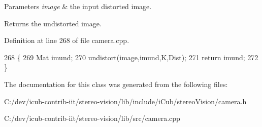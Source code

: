\begin{DoxyParams}{Parameters}
{\em image} & the input distorted image. \\
\hline
\end{DoxyParams}
\begin{DoxyReturn}{Returns}
the undistorted image. 
\end{DoxyReturn}


Definition at line 268 of file camera.\+cpp.


\begin{DoxyCode}
268                                     \{
269     Mat imund;
270     undistort(image,imund,K,Dist);
271     \textcolor{keywordflow}{return} imund;
272 \}
\end{DoxyCode}


The documentation for this class was generated from the following files\+:\begin{DoxyCompactItemize}
\item 
C\+:/dev/icub-\/contrib-\/iit/stereo-\/vision/lib/include/i\+Cub/stereo\+Vision/camera.\+h\item 
C\+:/dev/icub-\/contrib-\/iit/stereo-\/vision/lib/src/camera.\+cpp\end{DoxyCompactItemize}
